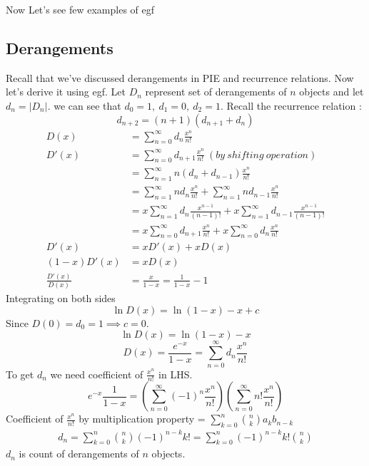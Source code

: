 \begin{enumerate}
 Now Let's see few examples of egf 
 \subsection{Derangements } Recall that we've discussed derangements in PIE and recurrence relations. Now let's derive it using egf. Let $D_n$ represent set of derangements of $n$ objects and let $d_n = |D_n|$. we can see that $d_0 = 1 ,~ d_1 = 0,~ d_2 = 1$. Recall the recurrence relation : $$ d_{n+2} = (n+1)(d_{n+1} + d_n)$$
 \begin{align*}
     D(x) &= \sum_{n=0}^{\infty} d_n \frac{x^n}{n!} \\
     D'(x) &= \sum_{n=0}^{\infty} d_{n+1} \frac{x^n}{n!} ~(by ~shifting ~operation)\\
     &= \sum_{n=1}^{\infty} n(d_n + d_{n-1}) \frac{x^n}{n!} \\
     &= \sum_{n=1}^{\infty} nd_n \frac{x^n}{n!} + \sum_{n=1}^{\infty} nd_{n-1} \frac{x^n}{n!} \\
     &= x \sum_{n=1}^{\infty} d_n \frac{x^{n-1}}{(n-1)!} + x \sum_{n=1}^{\infty} d_{n-1} \frac{x^{n-1}}{(n-1)!} \\
     &= x \sum_{n=0}^{\infty} d_{n+1} \frac{x^n}{n!} + x \sum_{n=0}^{\infty} d_n \frac{x^n}{n!} \\
     D'(x) &= xD'(x) + xD(x) \\
     (1-x)D'(x) &= xD(x) \\
     \frac{D'(x)}{D(x)} &= \frac{x}{1-x} = \frac{1}{1-x} - 1
 \end{align*}
Integrating on both sides
     $$\ln{D(x)} = \ln{(1-x)} - x + c$$
Since $D(0) = d_0 = 1 \implies c=0$.
    $$\ln{D(x)} = \ln{(1-x)} - x$$
    $$D(x) = \frac{e^{-x}}{1-x} = \sum_{n=0}^{\infty} d_n \frac{x^n}{n!}$$
To get $d_n$ we need coefficient of $\frac{x^n}{n!}$ in LHS.
$$e^{-x} \frac{1}{1-x} = (\sum_{n=0}^{\infty} (-1)^n \frac{x^n}{n!})(\sum_{n=0}^{\infty} n! \frac{x^n}{n!})$$
Coefficient of $\frac{x^n}{n!}$ by multiplication property = $\sum_{k=0}^{n} {n \choose k} a_k b_{n-k}$
\begin{align*}
    d_n = \sum_{k=0}^{n} {n \choose k} (-1)^{n-k} k!  
    = \sum_{k=0}^{n} (-1)^{n-k} k! {n \choose k}
\end{align*}
$d_n$ is count of derangements of $n$ objects.


\end{enumerate}
